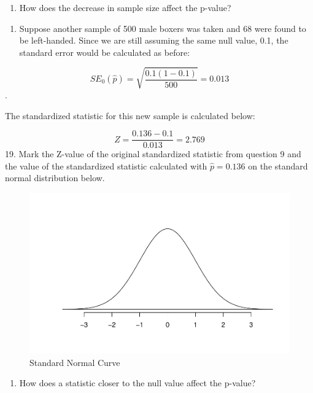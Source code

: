 \documentclass[
]{report}
\providecommand{\tightlist}{%
  \setlength{\itemsep}{0pt}\setlength{\parskip}{0pt}}
\begin{document}
\newpage

\begin{enumerate}
\def\labelenumi{\arabic{enumi}.}
\setcounter{enumi}{16}
\tightlist
\item
  How does the decrease in sample size affect the p-value?
\end{enumerate}

\vspace{0.3in}

\begin{enumerate}
\def\labelenumi{\arabic{enumi}.}
\setcounter{enumi}{17}
\tightlist
\item
  Suppose another sample of 500 male boxers was taken and 68 were found to be left-handed. Since we are still assuming the same null value, 0.1, the standard error would be calculated as before:
\end{enumerate}

\[SE_0(\hat{p})=\sqrt{\frac{0.1(1-0.1)}{500}} = 0.013\].

The standardized statistic for this new sample is calculated below:

\[Z = \frac{0.136-0.1}{0.013} = 2.769\]
19. Mark the Z-value of the original standardized statistic from question 9 and the value of the standardized statistic calculated with \(\hat{p}=0.136\) on the standard normal distribution below.

\begin{figure}

{\centering \includegraphics[width=0.5\linewidth]{04-A09-inference-1cat-theory_files/figure-latex/Norcuv-1} 

}

\caption{Standard Normal Curve}\label{fig:Norcuv}
\end{figure}

\begin{enumerate}
\def\labelenumi{\arabic{enumi}.}
\setcounter{enumi}{19}
\tightlist
\item
  How does a statistic closer to the null value affect the p-value?
\end{enumerate}
\end{document}
